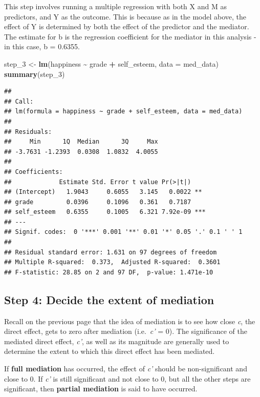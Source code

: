 \documentclass[
]{book}
\newenvironment{Shaded}{\begin{snugshade}}{\end{snugshade}}
\newcommand{\AttributeTok}[1]{\textcolor[rgb]{0.13,0.29,0.53}{#1}}
\newcommand{\FunctionTok}[1]{\textcolor[rgb]{0.13,0.29,0.53}{\textbf{#1}}}
\newcommand{\NormalTok}[1]{#1}
\newcommand{\OtherTok}[1]{\textcolor[rgb]{0.56,0.35,0.01}{#1}}
\newcommand{\SpecialCharTok}[1]{\textcolor[rgb]{0.81,0.36,0.00}{\textbf{#1}}}
\begin{document}
This step involves running a multiple regression with both X and M as predictors, and Y as the outcome. This is because as in the model above, the effect of Y is determined by both the effect of the predictor and the mediator. The estimate for b is the regression coefficient for the mediator in this analysis - in this case, b = 0.6355.

\begin{Shaded}
\begin{Highlighting}[]
\NormalTok{step\_3 }\OtherTok{\textless{}{-}} \FunctionTok{lm}\NormalTok{(happiness }\SpecialCharTok{\textasciitilde{}}\NormalTok{ grade }\SpecialCharTok{+}\NormalTok{ self\_esteem, }\AttributeTok{data =}\NormalTok{ med\_data)}
\FunctionTok{summary}\NormalTok{(step\_3)}
\end{Highlighting}
\end{Shaded}

\begin{verbatim}
## 
## Call:
## lm(formula = happiness ~ grade + self_esteem, data = med_data)
## 
## Residuals:
##     Min      1Q  Median      3Q     Max 
## -3.7631 -1.2393  0.0308  1.0832  4.0055 
## 
## Coefficients:
##             Estimate Std. Error t value Pr(>|t|)    
## (Intercept)   1.9043     0.6055   3.145   0.0022 ** 
## grade         0.0396     0.1096   0.361   0.7187    
## self_esteem   0.6355     0.1005   6.321 7.92e-09 ***
## ---
## Signif. codes:  0 '***' 0.001 '**' 0.01 '*' 0.05 '.' 0.1 ' ' 1
## 
## Residual standard error: 1.631 on 97 degrees of freedom
## Multiple R-squared:  0.373,  Adjusted R-squared:  0.3601 
## F-statistic: 28.85 on 2 and 97 DF,  p-value: 1.471e-10
\end{verbatim}

\subsection{Step 4: Decide the extent of mediation}\label{step-4-decide-the-extent-of-mediation}

Recall on the previous page that the idea of mediation is to see how close \emph{c}, the direct effect, gets to zero after mediation (i.e.~\emph{c'} = 0). The significance of the mediated direct effect, \emph{c'}, as well as its magnitude are generally used to determine the extent to which this direct effect has been mediated.

If \textbf{full mediation} has occurred, the effect of \emph{c'} should be non-significant and close to 0. If \emph{c'} is still significant and not close to 0, but all the other steps are significant, then \textbf{partial mediation} is said to have occurred.
\end{document}
